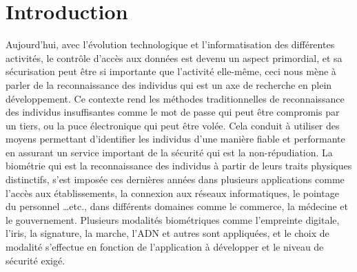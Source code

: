 \chapter*{Introduction}%
\tab Aujourd'hui, avec l'évolution technologique et l'informatisation des différentes activités, le contrôle d'accès aux données est devenu un aspect primordial, et sa sécurisation peut être si importante que l'activité elle-même, ceci nous mène à parler de la reconnaissance des individus qui est un axe de recherche en plein développement. Ce contexte rend les méthodes traditionnelles de reconnaissance des individus insuffisantes comme le mot de passe qui peut être compromis par un tiers, ou la puce électronique qui peut être volée. Cela conduit à utiliser des moyens permettant d'identifier les individus d'une manière fiable et performante en assurant un service important de la sécurité qui est la non-répudiation. La biométrie qui est la reconnaissance des individus à partir de leurs traits physiques distinctifs, s'est imposée ces dernières années dans plusieurs applications comme l'accès aux établissements, la connexion aux réseaux informatiques, le pointage du personnel …etc., dans différents domaines comme le commerce, la médecine et le gouvernement. Plusieurs modalités biométriques comme l'empreinte digitale, l'iris, la signature, la marche, l'ADN et autres sont appliquées, et le choix de modalité s'effectue en fonction de l'application à développer et le niveau de sécurité exigé. \\ \tab
 

